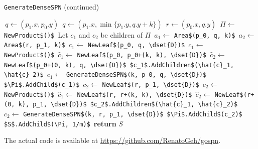\documentclass{amsart}
\theoremstyle{plain}
\numberwithin{equation}{section}
\newcommand{\mcode}[1]{\lstinline[mathescape]!#1!}
\newcommand{\dset}[1]{\mathcal{#1}}
\begin{document}
\begin{algorithm}[H]
  \caption*{\mcode{GenerateDenseSPN} (continued)}
  \begin{algorithmic}[1]
    \State\,$q \gets (p_1.x, p_0.y)$
        \State\,$q \gets (p_1.x, \min\{p_1.y, q.y + k\})$
        \State\,$r \gets (p_0.x, q.y)$
        \State\,$\Pi \gets$ \mcode{NewProduct$()$}
        \State\,Let $c_1$ and $c_2$ be children of $\Pi$
        \State\,$a_1 \gets$ \mcode{Area$(p_0, q, k)$}
        \State\,$a_2 \gets$ \mcode{Area$(r, p_1, k)$}
          \State\,$c_1 \gets$ \mcode{NewLeaf$(p_0, q, \dset{D})$}
          \State\,$c_1 \gets$ \mcode{NewProduct$()$}
          \State\,$\hat{c}_1 \gets$ \mcode{NewLeaf$(p_0, p_0+(k, k), \dset{D})$}
          \State\,$\hat{c}_2 \gets$ \mcode{NewLeaf$(p_0+(0, k), q, \dset{D})$}
          \State\,\mcode{$c_1$.AddChildren$(\hat{c}_1, \hat{c}_2)$}
        \Else%
          \State\,$c_1 \gets$ \mcode{GenerateDenseSPN$(k, p_0, q, \dset{D})$}
        \EndIf%
        \State\,\mcode{$\Pi$.AddChild$(c_1)$}
          \State\,$c_2 \gets$ \mcode{NewLeaf$(r, p_1, \dset{D})$}
          \State\,$c_2 \gets$ \mcode{NewProduct$()$}
          \State\,$\hat{c}_1 \gets$ \mcode{NewLeaf$(r, r+(k, k), \dset{D})$}
          \State\,$\hat{c}_2 \gets$ \mcode{NewLeaf$(r+(0, k), p_1, \dset{D})$}
          \State\,\mcode{$c_2$.AddChildren$(\hat{c}_1, \hat{c}_2)$}
        \Else%
          \State\,$c_2 \gets$ \mcode{GenerateDenseSPN$(k, r, p_1, \dset{D})$}
        \EndIf%
        \State\,\mcode{$\Pi$.AddChild$(c_2)$}
        \State\,\mcode{$S$.AddChild$(\Pi, 1/m)$}
      \EndFor%
    \EndIf%
    \State\,\textbf{return} $S$
  \end{algorithmic}
\end{algorithm}

The actual code is available at \url{https://github.com/RenatoGeh/gospn}.


\printbibliography[]
\end{document}
